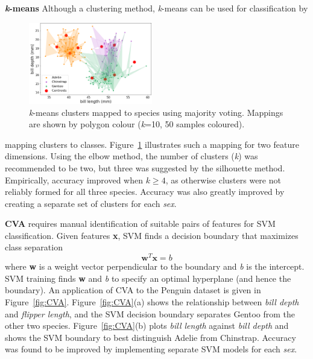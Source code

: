 \documentclass[a4paper, 11pt]{article}
\begin{document}
\textbf{\textit{k}-means} Although a clustering method, 
\textit{k}-means can be used for classification by 
\begin{figure} %
  \centering
  \vspace{-0.8\baselineskip} %
  \includegraphics[width=0.48\textwidth]{kmeansmap.png} %
  \vspace{-0.5\baselineskip} %
  \caption{\centering\linespread{0.8}\selectfont \textit{k}-means clusters mapped to species using majority voting. 
  Mappings are shown by polygon colour (\textit{k}=10, 50 samples coloured).}
  \vspace{-1\baselineskip} %
  \label{fig:kmeansmap}
\end{figure}
mapping clusters to classes. 
Figure~\ref{fig:kmeansmap} illustrates such a mapping for two feature dimensions.
Using the elbow method, the number of clusters (\textit{k}) was recommended to be two, but three was suggested 
by the silhouette method. Empirically, accuracy improved when \(k \geq 4\),
as otherwise clusters were not reliably formed for all three species.   
Accuracy was also greatly improved by creating a separate set of clusters for each \textit{sex}.

\textbf{CVA}  
requires manual identification of suitable pairs of features for SVM classification. 
Given features \textbf{x}, SVM finds a decision boundary that maximizes class separation
\vspace{-0.8\baselineskip} %
\begin{equation}
\mathbf{w}^T \mathbf{x} = b
\end{equation}
where \textbf{w} is a weight vector perpendicular to the boundary and \textit{b} is the intercept. 
SVM training finds \textbf{w} and \textit{b} to specify an optimal hyperplane (and hence the boundary). 
An application of CVA to the Penguin dataset is given in Figure~\ref{fig:CVA}. 
Figure~\ref{fig:CVA}(a) shows the relationship between \textit{bill depth} and \textit{flipper length}, and
the SVM decision boundary separates Gentoo from the other two species. 
Figure~\ref{fig:CVA}(b) plots \textit{bill length} against \textit{bill depth} and shows the SVM boundary to best
distinguish Adelie from Chinstrap. Accuracy was found to be improved by implementing separate SVM models for each \textit{sex}.
\end{document}
